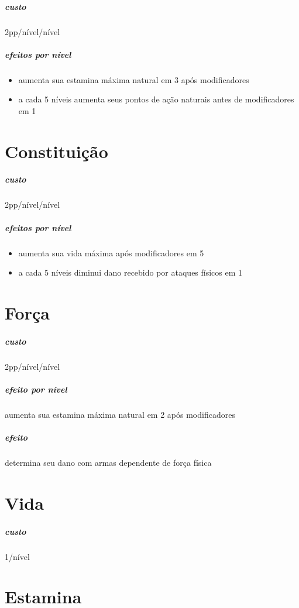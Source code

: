 \paragraph{}
\subparagraph{custo} 2pp/nível/nível
\subparagraph{efeitos por nível} 
\begin{itemize}
  \item aumenta sua estamina máxima natural em 3 após modificadores
  \item a cada 5 níveis aumenta seus pontos de ação naturais antes de modificadores em 1
\end{itemize}
\section{Constituição}
\paragraph{}
\subparagraph{custo} 2pp/nível/nível
\subparagraph{efeitos por nível} 
\begin{itemize}
  \item aumenta sua vida máxima após modificadores em 5
  \item a cada 5 níveis diminui dano recebido por ataques físicos em 1 
\end{itemize}
\section{Força}
\paragraph{}
\subparagraph{custo} 2pp/nível/nível
\subparagraph{efeito por nível} aumenta sua estamina máxima natural em 2 após modificadores
\subparagraph{efeito} determina seu dano com armas dependente de força física
\section{Vida}
\paragraph{}
\subparagraph{custo} 1/nível
\section{Estamina}
\paragraph{}
\subparagraph{}
